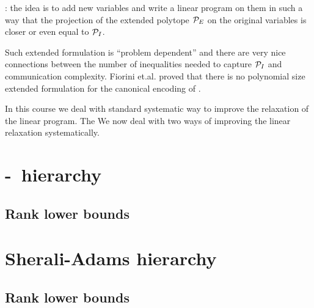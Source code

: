 \documentclass[a4paper,twoside,justified]{tufte-handout}
\begin{document}
: the idea is to add new variables
and write a linear program on them in such a way that the projection
of the extended polytope $\mathcal{P}_{E}$ on the original variables is
closer or even equal to $ \mathcal{P}_{I} $.

Such extended formulation is ``problem dependent'' and there are very
nice connections between the number of inequalities needed to capture
$ \mathcal{P}_{I} $ and communication complexity. Fiorini
et.al.\cite{fiorini2007linear} proved that there is no polynomial size
extended formulation for the canonical encoding of
.



In this course we deal with standard systematic way to improve the
relaxation of the linear program. The We now deal with two ways of
improving the linear relaxation systematically.

\section{\Lovasz-\Schrijver\ hierarchy}

\subsection{Rank lower bounds}

\section{Sherali-Adams hierarchy}

\subsection{Rank lower bounds}




\end{document}
